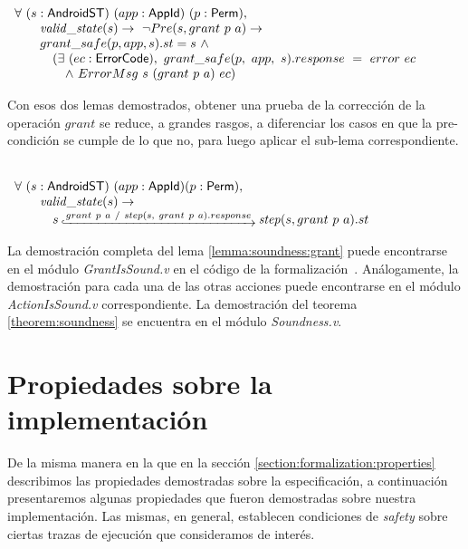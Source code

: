 \begin{lemma}
     \mbox{} \\
    $ \begin{array}[t]{l} \forall\ (s:\AndroidState)\ (app:\AppId)\ (p:\Perm),
            \\
            \quad \quad \ap{valid\_state}{s} \rightarrow\ \neg Pre(s, grant\ p\ a) \rightarrow
            \\
            \quad \quad grant\_safe(p, app, s).st = s\ \land
            \\
            \quad \quad \quad (\exists\ (ec: \ErrorCode),\ grant\_safe(p,\ app,\ s).response\ =\
            error\ ec \\
            \quad \quad \quad \quad \land\ ErrorMsg\ s\ (grant\ p\ a)\ ec)
            \\
        \end{array} $
\end{lemma}

Con esos dos lemas demostrados, obtener una prueba de la corrección de la operación $grant$ se
reduce, a grandes rasgos, a diferenciar los casos en que la pre-condición se cumple de lo que no,
para luego aplicar el sub-lema correspondiente.

\begin{lemma}
     \label{lemma:soundness:grant} \mbox{} \\
    $ \begin{array}[t]{l} \forall\ (s:\AndroidState)\ (app:\AppId) (p:\Perm),
            \\
            \quad \quad \ap{valid\_state}{s} \rightarrow\
            \\
            \quad \quad \quad s\step{grant\ p\ a\ /\ step(s,\ grant\ p\ a).response}
            \bap{step}{s}{grant\ p\ a}.st \\
        \end{array} $
\end{lemma}

La demostración completa del lema \ref{lemma:soundness:grant} puede encontrarse en el módulo
\textit{GrantIsSound.v} en el código de la formalización~\cite{github-code}. Análogamente, la
demostración para cada una de las otras acciones puede encontrarse en el módulo
\textit{ActionIsSound.v} correspondiente. La demostración del teorema \ref{theorem:soundness} se
encuentra en el módulo \textit{Soundness.v}.

\section{Propiedades sobre la implementación}
De la misma manera en la que en la sección \ref{section:formalization:properties} describimos las
propiedades demostradas sobre la especificación, a continuación presentaremos algunas propiedades
que fueron demostradas sobre nuestra implementación. Las mismas, en general, establecen condiciones
de \textit{safety} sobre ciertas trazas de ejecución que consideramos de interés.

